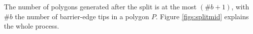 \documentclass[pdflatex,sn-mathphys]{sn-jnl}%
\theoremstyle{thmstyleone}%
\theoremstyle{thmstyletwo}%
\theoremstyle{thmstylethree}%
\begin{document}
The number of polygons generated after the split is at the most $(\#b + 1)$, with $\#b$ the number of barrier-edge tips in a polygon $P$. Figure \ref{figs:splitmid} explains the whole process.












\end{document}
